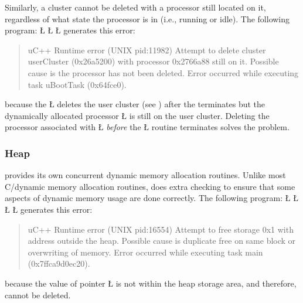 \documentclass[openright,twoside]{report}
\begin{document}
Similarly, a cluster cannot be deleted with a processor still located on it, regardless of what state the processor is in (i.e., running or idle).
The following program:
\LGinlinefalse\LGbegin\lgrinde
\L{}
\L{\LB{}}
\L{\LB{\}}}
\endlgrinde\LGend
generates this error:
\begin{quote}
\BGfont
uC++ Runtime error (UNIX pid:11982) Attempt to delete cluster userCluster (0x26a5200) with processor 0x2766a88 still on it.
Possible cause is the processor has not been deleted.
Error occurred while executing task uBootTask (0x64fce0).
\end{quote}
because the \LGinlinetrue\LGbegin\lgrinde\L{}\endlgrinde\LGend{} deletes the user cluster (see ) after the  terminates but the dynamically allocated processor \LGinlinetrue\LGbegin\lgrinde\L{}\endlgrinde\LGend{} is still on the user cluster.
Deleting the processor associated with \LGinlinetrue\LGbegin\lgrinde\L{}\endlgrinde\LGend{} \emph{before} the \LGinlinetrue\LGbegin\lgrinde\L{}\endlgrinde\LGend{} routine terminates solves the problem.


\subsubsection{Heap}
\label{s:Heap}

\uC provides its own concurrent dynamic memory allocation routines.
Unlike most C/\CC dynamic memory allocation routines, \uC does extra checking to ensure that some aspects of dynamic memory usage are done correctly.
The following program:
\LGinlinefalse\LGbegin\lgrinde
\L{}
\L{\LB{}}
\CE{}\L{\LB{}}
\L{\LB{\}}}
\endlgrinde\LGend
generates this error:
\begin{quote}
\BGfont
uC++ Runtime error (UNIX pid:16554) Attempt to free storage 0x1 with address outside the heap.
Possible cause is duplicate free on same block or overwriting of memory.
Error occurred while executing task main (0x7ffca9d0ec20).
\end{quote}
because the value of pointer \LGinlinetrue\LGbegin\lgrinde\L{}\endlgrinde\LGend{} is not within the heap storage area, and therefore, cannot be deleted.
\end{document}
